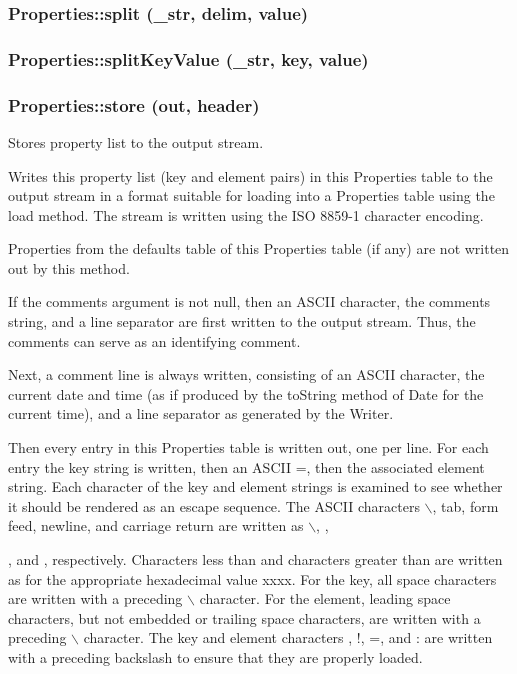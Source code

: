 \subsubsection{\setlength{\rightskip}{0pt plus 5cm}Properties::split (\_\-str, delim, value)}\label{classProperties_Propertiesa26}


\subsubsection{\setlength{\rightskip}{0pt plus 5cm}Properties::split\-Key\-Value (\_\-str, key, value)}\label{classProperties_Propertiesa25}


\subsubsection{\setlength{\rightskip}{0pt plus 5cm}Properties::store (out, header)}\label{classProperties_Propertiesa16}


Stores property list to the output stream. 

Writes this property list (key and element pairs) in this Properties table to the output stream in a format suitable for loading into a Properties table using the load method. The stream is written using the ISO 8859-1 character encoding.

Properties from the defaults table of this Properties table (if any) are not written out by this method.

If the comments argument is not null, then an ASCII character, the comments string, and a line separator are first written to the output stream. Thus, the comments can serve as an identifying comment.

Next, a comment line is always written, consisting of an ASCII character, the current date and time (as if produced by the to\-String method of Date for the current time), and a line separator as generated by the Writer.

Then every entry in this Properties table is written out, one per line. For each entry the key string is written, then an ASCII =, then the associated element string. Each character of the key and element strings is examined to see whether it should be rendered as an escape sequence. The ASCII characters $\backslash$, tab, form feed, newline, and carriage return are written as $\backslash$, ,  \par
, and , respectively. Characters less than  and characters greater than  are written as  for the appropriate hexadecimal value xxxx. For the key, all space characters are written with a preceding $\backslash$ character. For the element, leading space characters, but not embedded or trailing space characters, are written with a preceding $\backslash$ character. The key and element characters , !, =, and : are written with a preceding backslash to ensure that they are properly loaded.

